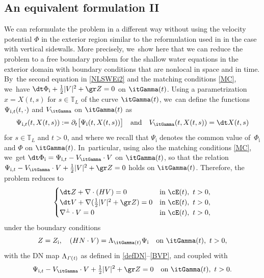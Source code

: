 \subsection{An equivalent formulation II}\label{subsect:EF2}
We can reformulate the problem in a different way without using the velocity potential $\Phi$ in the exterior region similar to the reformulation used in
\cite[Section 5.1]{IguchiLannes2023} in the case with vertical sidewalls.
More precisely, we~show here that we can reduce the problem to a free boundary problem for the shallow water equations in the exterior domain
with boundary conditions that are nonlocal in space and in time. By~the second equation in \eqref{NLSWEi2} and the matching conditions \eqref{MC}, we~have $\dt\Phi_\mathrm{i}+\frac12|V|^2+\gr Z=0$ on $\itGamma(t)$.
Using a parametrization $x=X(t,s)$ for $s\in {\mathbb T}_L$ of the curve $\itGamma(t)$, we~can define the functions $\Psi_{{\rm i},t}(t,\cdot)$ and $V_{\itGamma}$ on $\itGamma(t)$ as
\[
\Psi_{{\rm i},t}(t,X(t,s)):=\partial_t \bigl[ \Psi_\mathrm{i}(t,X(t,s))\bigr] \quad\mbox{and}\quad V_\itGamma(t,X(t,s))=\dt X(t,s)
\]
for $s\in {\mathbb T}_L$ and $t>0$, and where we recall that $\Psi_\mathrm{i}$ denotes the common value of~$\Phi_\mathrm{i}$ and $\Phi$ on $\itGamma(t)$. In~particular, using also the matching conditions \eqref{MC}, we~get $\dt \Phi_\mathrm{i}=\Psi_{{\rm i},t} - V_\itGamma\cdot V$ on $\itGamma(t)$,
so that the relation $\Psi_{{\rm i},t} - V_\itGamma\cdot V+\tfrac12|V|^2+\gr Z=0$ holds on $\itGamma(t)$.
Therefore, the problem reduces to
\begin{equation}\label{NLSWEe4}
\begin{cases}
\dt Z+\nabla\cdot(HV) = 0 &\text{in } \cE(t), \ t>0, \\
\dt V+\nabla(\frac12|V|^2+\gr Z) = 0 &\text{in } \cE(t), \ t>0, \\
\nabla^\perp\cdot V = 0 &\text{in } \cE(t), \ t>0,
\end{cases}
\end{equation}
under the boundary conditions
\begin{equation}\label{BC4}
Z=Z_\mathrm{i}, \quad (HN\cdot V) = \Lambda_{\itGamma(t)}\Psi_\mathrm{i} \quad\text{on } \itGamma(t), \ t>0,
\end{equation}
with the DN map $\Lambda_{\it\Gamma(t)}$ as defined in \eqref{defDN}--\eqref{BVP}, and coupled with
\begin{equation}\label{ODE}
\Psi_{{\rm i},t} - V_\itGamma\cdot V+\tfrac12 |V|^2+\gr Z=0 \quad\text{on } \itGamma(t), \ t>0.
\end{equation}

